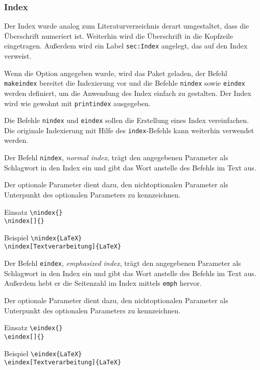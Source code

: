 \subsubsection{Index}
\label{sec:New:Index}

Der Index wurde analog zum Literaturverzeichnis derart umgestaltet,
dass die Überschrift numeriert ist.
Weiterhin wird die Überschrift in die Kopfzeile eingetragen.
Außerdem wird ein Label \verb#sec:Index# angelegt, das auf den Index verweist.

Wenn die Option  angegeben wurde, wird das Paket 
geladen, der Befehl \verb#makeindex# bereitet die Indexierung vor und die
Befehle \verb#nindex# sowie \verb#eindex# werden definiert, um die Anwendung
des Index einfach zu gestalten.
Der Index wird wie gewohnt mit \verb#printindex# ausgegeben.

Die Befehle \verb#nindex# und \verb#eindex# sollen die Erstellung
eines Index vereinfachen.
Die originale Indexierung mit Hilfe des \verb#index#-Befehls kann
weiterhin verwendet werden.

\DescribeMacro{\nindex}
Der Befehl \verb#nindex#, \emph{normal index}, trägt den angegebenen Parameter als
Schlagwort in den Index ein und gibt das Wort anstelle des Befehls im Text aus.

Der optionale Parameter dient dazu, den nichtoptionalen Parameter als Unterpunkt
des optionalen Parameters zu kennzeichnen.
\begin{einspiel}{Einsatz}
 \>\verb#\nindex{#\verb#}#\\
 \>\verb#\nindex[#\verb#]{#\verb#}#
\end{einspiel}
\begin{einspiel}{Beispiel}
 \>\verb#\nindex{LaTeX}#\\
 \>\verb#\nindex[Textverarbeitung]{LaTeX}#
\end{einspiel}

\DescribeMacro{\eindex}
Der Befehl \verb#eindex#, \emph{emphasized index},  trägt den angegebenen Parameter
als Schlagwort in den Index ein und gibt das Wort anstelle des Befehls im Text aus.
Außerdem hebt er die Seitenzahl im Index mittels \verb#emph# hervor.

Der optionale Parameter dient dazu, den nichtoptionalen Parameter als
Unterpunkt des optionalen Parameters zu kennzeichnen.
\begin{einspiel}{Einsatz}
 \>\verb#\eindex{#\verb#}#\\
 \>\verb#\eindex[#\verb#]{#\verb#}#
\end{einspiel}
\begin{einspiel}{Beispiel}
 \>\verb#\eindex{LaTeX}#\\
 \>\verb#\eindex[Textverarbeitung]{LaTeX}#
\end{einspiel}

